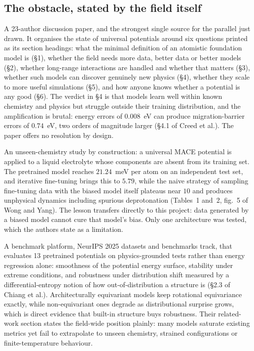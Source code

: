 \documentclass[11pt, a4paper]{article}
\begin{document}
\subsection{The obstacle, stated by the field itself}

\begin{description}[style=nextline]
  \item[Creed et al., six open questions~\citep{sixquestions}]
  A 23-author discussion paper, and the strongest single source for the
  parallel just drawn. It organises the state of universal potentials around six questions
  printed as its section headings: what the minimal definition of an atomistic
  foundation model is (\S{}1), whether the field needs more data, better data or
  better models (\S{}2), whether long-range interactions are handled and whether
  that matters (\S{}3), whether such models can discover genuinely new physics
  (\S{}4), whether they scale to more useful simulations (\S{}5), and how anyone
  knows whether a potential is any good (\S{}6). The verdict in \S{}4 is that models
  learn well within known chemistry and physics but struggle outside their
  training distribution, and the amplification is brutal: energy errors of
  $0.008$~eV can produce migration-barrier errors of $0.74$~eV, two orders of
  magnitude larger (\S{}4.1 of Creed et al.). The paper offers no resolution by
  design.
  \item[Wong and Yang, bias and fine-tuning~\citep{mlipbias}]
  An unseen-chemistry study by construction: a universal MACE potential is
  applied to a liquid electrolyte whose components are absent from its
  training set. The pretrained model reaches $21.24$~meV per atom on an
  independent test set, and iterative fine-tuning brings this to $5.79$, while
  the naive strategy of sampling fine-tuning data with the biased model itself
  plateaus near $10$ and produces unphysical dynamics including spurious
  deprotonation (Tables~1 and~2, fig.~5 of Wong and Yang). The lesson
  transfers directly to this project: data generated by a biased model cannot
  cure that model's bias. Only one architecture was tested, which the authors
  state as a limitation.
  \item[Chiang et al., MLIP Arena~\citep{mliparena}]
  A benchmark platform, NeurIPS 2025 datasets and benchmarks track, that
  evaluates 13 pretrained potentials on physics-grounded tests rather than
  energy regression alone: smoothness of the potential energy surface,
  stability under extreme conditions, and robustness under distribution shift
  measured by a differential-entropy notion of how out-of-distribution a
  structure is (\S{}2.3 of Chiang et al.). Architecturally equivariant models
  keep rotational equivariance exactly, while non-equivariant ones degrade as
  distributional surprise grows, which is direct evidence that built-in
  structure buys robustness. Their related-work section states the field-wide
  position plainly: many models saturate existing metrics yet fail to
  extrapolate to unseen chemistry, strained configurations or
  finite-temperature behaviour.
\end{description}
\end{document}
